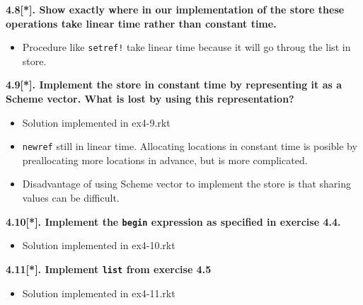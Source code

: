 \textbf{4.8[*]. Show exactly where in our implementation of the store these operations take linear time rather than constant time.}
\begin{itemize}
    \item Procedure like \texttt{setref!} take linear time because it will go throug the list in store.
\end{itemize}

\textbf{4.9[*]. Implement the store in constant time by representing it as a Scheme vector. What is lost by using this representation?}
\begin{itemize}
    \item Solution implemented in ex4-9.rkt
    \item \texttt{newref} still in linear time. Allocating locations in constant time is posible by preallocating more locations in advance, but is more complicated. 
    \item Disadvantage of using Scheme vector to implement the store is that sharing values can be difficult.
\end{itemize}

\textbf{4.10[*]. Implement the \texttt{begin} expression as specified in exercise 4.4.}
\begin{itemize}
    \item Solution implemented in ex4-10.rkt
\end{itemize}

\textbf{4.11[*]. Implement \texttt{list} from exercise 4.5}
\begin{itemize}
    \item Solution implemented in ex4-11.rkt
\end{itemize}



